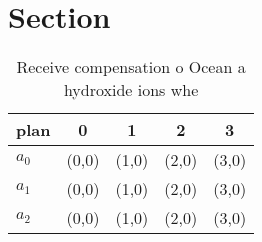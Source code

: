 \documentclass[a4paper]{article}
\begin{document}
\section{Section}

\begin{table}
\begin{adjustbox}{width=0.5\columnwidth}
\begin{tabular}{|l|l|l|l|l|}
\hline
\textbf{plan} & \multicolumn{1}{c|}{\textbf{0}} & \multicolumn{1}{c|}{\textbf{1}} & \multicolumn{1}{c|}{\textbf{2}} & \multicolumn{1}{c|}{\textbf{3}} \\ \hline
\textbf{$a_0$}  & (0,0) & (1,0) & (2,0) & (3,0) \\ \hline
\textbf{$a_1$}  & (0,0) & (1,0) & (2,0) & (3,0) \\ \hline
\textbf{$a_2$}  & (0,0) & (1,0) & (2,0) & (3,0) \\ \hline
\end{tabular}
\end{adjustbox}
\caption{Receive compensation o Ocean a hydroxide ions whe
}
\end{table}
\end{document}
